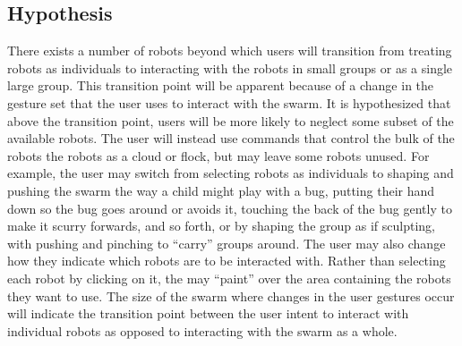 \documentclass[]{article}
\begin{document}
\subsection{Hypothesis}

There exists a number of robots beyond which users will transition from treating robots as individuals to interacting with the robots in small groups or as a single large group. 
This transition point will be apparent because of a change in the gesture set that the user uses to interact with the swarm. 
It is hypothesized that above the transition point, users will be more likely to neglect some subset of the available robots. 
The user will instead use commands that control the bulk of the robots the robots as a cloud or flock, but may leave some robots unused. 
For example, the user may switch from selecting robots as individuals to shaping and pushing the swarm the way a child might play with a bug, putting their hand down so the bug goes around or avoids it, touching the back of the bug gently to make it scurry forwards, and so forth, or by shaping the group as if sculpting, with pushing and pinching to ``carry'' groups around. 
The user may also change how they indicate which robots are to be interacted with. 
Rather than selecting each robot by clicking on it, the may ``paint'' over the area containing the robots they want to use. 
The size of the swarm where changes in the user gestures occur will indicate the transition point between the user intent to interact with individual robots as opposed to interacting with the swarm as a whole. 
\end{document}
